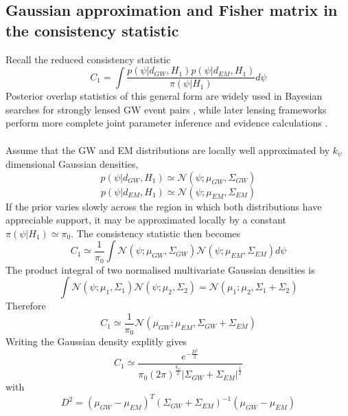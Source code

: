 \documentclass[pdflatex,sn-mathphys-num]{sn-jnl}%
\theoremstyle{thmstyleone}%
\theoremstyle{thmstyletwo}%
\theoremstyle{thmstylethree}%
\begin{document}
\begin{appendices}
\section{Gaussian approximation and Fisher matrix in the consistency statistic}
Recall the reduced consistency statistic
\begin{equation}
C_1 = \int \frac{p(\psi|d_{GW},H_1)p(\psi|d_{EM},H_1)}{\pi(\psi|H_1)} d\psi
\end{equation}
Posterior overlap statistics of this general form are widely used in Bayesian searches for strongly lensed GW event pairs \cite{22}, while later lensing frameworks perform more complete joint parameter inference and evidence calculations \cite{23}\cite{9}.\\
\\Assume that the GW and EM distributions are locally well approximated by $k_{\psi}$ dimensional Gaussian densities,
\begin{equation}
p(\psi|d_{GW},H_1) \simeq \mathcal{N}(\psi;\mu_{GW},\Sigma_{GW})
\end{equation}
\begin{equation}
p(\psi|d_{EM},H_1) \simeq \mathcal{N}(\psi;\mu_{EM},\Sigma_{EM})
\end{equation}
If the prior varies slowly across the region in which both distributions have appreciable support, it may be approximated locally by a constant $\pi(\psi|H_1) \simeq \pi_0$.
The consistency statistic then becomes
\begin{equation}
C_1 \simeq \frac{1}{\pi_0} \int \mathcal{N}(\psi;\mu_{GW},\Sigma_{GW}) \mathcal{N}(\psi;\mu_{EM},\Sigma_{EM}) d\psi
\end{equation}
The product integral of two normalised multivariate Gaussian densities is
\begin{equation}
\int \mathcal{N}(\psi;\mu_1,\Sigma_1) \mathcal{N}(\psi;\mu_2,\Sigma_2) = \mathcal{N}(\mu_1;\mu_2,\Sigma_1+\Sigma_2)
\end{equation}
Therefore
\begin{equation}
C_1 \simeq \frac{1}{\pi_0} \mathcal{N}(\mu_{GW};\mu_{EM},\Sigma_{GW}+\Sigma_{EM})
\end{equation}
Writing the Gaussian density explitly gives
\begin{equation}
C_1 \simeq \frac{e^{-\frac{D^2}{2}}}{\pi_0(2\pi)^{\frac{k_{\psi}}{2}}|\Sigma_{GW}+\Sigma_{EM}|^{\frac{1}{2}}}
\end{equation}
with
\begin{equation}
D^2=(\mu_{GW}-\mu_{EM})^T(\Sigma_{GW}+\Sigma_{EM})^{-1}(\mu_{GW}-\mu_{EM})

\end{equation}
\end{appendices}
\end{document}
